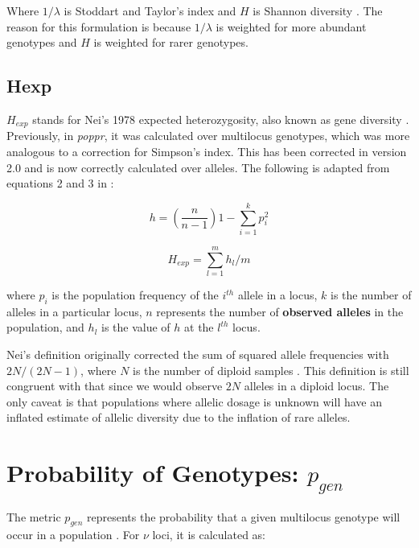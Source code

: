 \documentclass[letterpaper]{article}\usepackage[]{graphicx}\usepackage[]{color}
\newcommand{\poppr}{\textit{poppr}}
\begin{document}
Where $1/\lambda$ is Stoddart and Taylor's index and $H$ is Shannon diversity
\citep{Stoddart:1988,Shannon:1948}. The reason for this formulation is because
$1/\lambda$ is weighted for more abundant genotypes and $H$ is weighted for 
rarer genotypes.

\subsection{Hexp}

$H_{exp}$ stands for Nei's 1978 expected heterozygosity, also known as gene
diversity \citep{nei1978estimation}. Previously, in \poppr{}, it was calculated
over multilocus genotypes, which was more analogous to a correction for
Simpson's index. This has been corrected in version 2.0 and is now correctly
calculated over alleles. The following is adapted from equations 2 and 3 in
\citep{nei1978estimation}:

\begin{equation}
h = \left(\frac{n}{n-1}\right) 1 - \sum_{i = 1}^k{p^{2}_{i}}
\end{equation}

\begin{equation}
H_{exp} = \sum_{l = 1}^m{h_l/m}
\end{equation}

where $p_i$ is the population frequency of the $i^{th}$ allele in a locus, $k$
is the number of alleles in a particular locus, $n$ represents the number of
\textbf{observed alleles} in the population, and $h_l$ is the value of $h$ at
the $l^{th}$ locus.

Nei's definition originally corrected the sum of squared allele frequencies with
$2N/(2N - 1)$, where $N$ is the number of diploid samples
\citep{nei1978estimation}. This definition is still congruent with that since we
would observe $2N$ alleles in a diploid locus. The only caveat is that
populations where allelic dosage is unknown will have an inflated estimate of
allelic diversity due to the inflation of rare alleles.

\section{Probability of Genotypes: $p_{gen}$}

The metric $p_{gen}$ represents the probability that a given multilocus genotype
will occur in a population \citep{parks1993study, arnaud2007standardizing}. For 
$\nu$ loci, it is calculated as:
\end{document}
